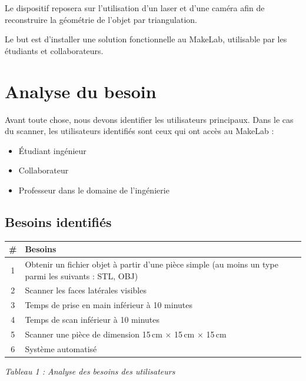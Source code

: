 \documentclass[11pt,a4paper]{report}
\begin{document}
Le dispositif reposera sur l’utilisation d’un laser et d’une caméra afin de reconstruire la géométrie de l’objet par triangulation.

Le but est d’installer une solution fonctionnelle au MakeLab, utilisable par les étudiants et collaborateurs.


\chapter{Analyse du besoin}

Avant toute chose, nous devons identifier les utilisateurs principaux. Dans le cas du scanner, les utilisateurs identifiés sont ceux qui ont accès au MakeLab :

\begin{itemize}
\item Étudiant ingénieur
\item Collaborateur
\item Professeur dans le domaine de l’ingénierie
\end{itemize}

\section*{Besoins identifiés}

\begin{center}
\begin{tabularx}{\textwidth}{c X}
\toprule
\textbf{\#} & \textbf{Besoins} \\
\midrule
1 & Obtenir un fichier objet à partir d’une pièce simple (au moins un type parmi les suivants : STL, OBJ) \\
2 & Scanner les faces latérales visibles \\
3 & Temps de prise en main inférieur à 10 minutes \\
4 & Temps de scan inférieur à 10 minutes \\
5 & Scanner une pièce de dimension 15\,cm × 15\,cm × 15\,cm \\
6 & Système automatisé \\
\bottomrule
\end{tabularx}
\end{center}

\begin{center}
\textit{Tableau 1 : Analyse des besoins des utilisateurs}
\end{center}
\end{document}
